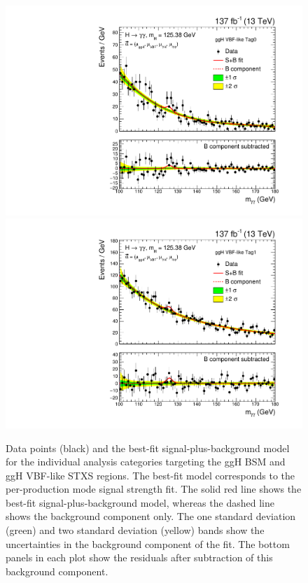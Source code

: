 \begin{figure}[htbp]
  \includegraphics[width=.32\linewidth]{Figures/app_sb_models/RECO_VBFLIKEGGH_Tag0_CMS_hgg_mass.pdf}
  \includegraphics[width=.32\linewidth]{Figures/app_sb_models/RECO_VBFLIKEGGH_Tag1_CMS_hgg_mass.pdf}
  \caption[Observed diphoton mass distributions: ggH BSM and ggH VBF-like]
  {
    Data points (black) and the best-fit signal-plus-background model for the individual analysis categories targeting the ggH BSM and ggH VBF-like STXS regions. The best-fit model corresponds to the per-production mode signal strength fit. The solid red line shows the best-fit signal-plus-background model, whereas the dashed line shows the background component only. The one standard deviation (green) and two standard deviation (yellow) bands show the uncertainties in the background component of the fit. The bottom panels in each plot show the residuals after subtraction of this background component.
  }
  \label{fig:diphoton_mass_2}
\end{figure}

